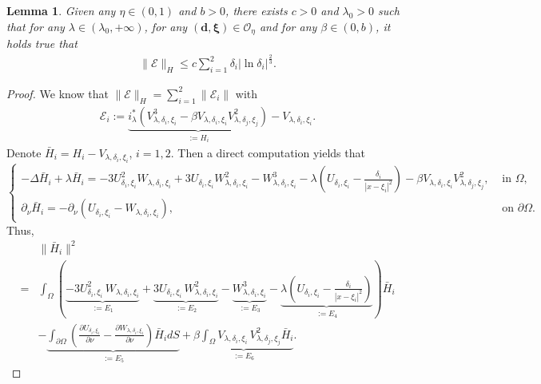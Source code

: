 \documentclass[a4paper,reqno,11pt,oneside]{amsart}
\numberwithin{equation}{section}
\newtheorem{Lem}[Thm]{Lemma}
\begin{document}
    \begin{Lem}\label{errore}Given any $\eta\in(0,1)$ and $b>0$, there exists $c>0$ and $\lambda_0>0$ such that for any $\lambda \in (\lambda_0,+\infty)$, for any $\left(\bm{d}, \bm{\xi}\right)\in \mathcal{O}_\eta$ and for any $\beta\in (0,b)$, it holds true that
    \begin{align}
    \label{error-size-1-vec} \|\bm{\mathcal{E}}\|_{H} \leq c \sum_{i=1}^2\delta_i|\ln{\delta_i}|^{\frac{2}{3}}.
\end{align}
\end{Lem}
\begin{proof}
We know that
$
\|\bm{\mathcal{E}}\|_H=\sum_{i=1}^2\|\mathcal{E}_i\|
$ with 
\begin{align*}
    \mathcal{E}_i:= \underbrace{i_\lambda^{*}\left(V_{\lambda,\delta_i,\xi_i}^3-\beta V_{\lambda,\delta_i,\xi_i}V_{\lambda,\delta_j,\xi_j}^2\right)}_{:=H_i}-V_{\lambda,\delta_i,\xi_i}.
\end{align*}
Denote $\bar H_i=H_i-V_{\lambda,\delta_i,\xi_i}$, $i=1,2$. Then a direct computation yields that
$$    
\begin{cases}
-\Delta \bar H_i\!+\!\lambda \bar H_i\!=-3 U_{ {\delta_i}, {\xi_i}}^2W_{\lambda,\delta_i,\xi_i}\!+\!3U_{ {\delta_i}, {\xi_i}}W_{\lambda,\delta_i,\xi_i}^2\!-\!W_{\lambda,\delta_i,\xi_i}^3\!-\!\lambda\!\left(\!U_{ {\delta_i}, {\xi_i}}-\frac{\delta_i}{|x-\xi_i|^{2}}\!\right)\!-\beta V_{\lambda,\delta_i,\xi_i}\!V_{\lambda,\delta_j,\xi_j}^2, &\text{ in $\Omega$},\\
\partial_{\nu} \bar H_i=-\partial_{\nu}\left( U_{ {\delta_i}, {\xi_i}}-W_{\lambda,\delta_i,\xi_i}\right),&\text{ on $\partial\Omega$.}\end{cases}
$$
Thus,
\begin{align*}
    &\|\bar H_i\|^2\\=&\displaystyle\int_{\Omega}\left({\underbrace{-3 U_{ {\delta_i}, {\xi_i}}^2\,W_{\lambda,\delta_i,\xi_i}}_{:=E_1}+\underbrace{3U_{ {\delta_i}, {\xi_i}}\,W_{\lambda,\delta_i,\xi_i}^2}_{:=E_2}-\underbrace{W_{\lambda,\delta_i,\xi_i}^3}_{:=E_3}-\underbrace{\lambda\left(U_{ {\delta_i}, {\xi_i}}-\frac{\delta_i}{|x-\xi_i|^{2}}\right)}_{:=E_4}}\right)\bar H_i\\&-\underbrace{\displaystyle{\int_{\partial\Omega}}\left(\frac{\partial U_{ {\delta_i}, {\xi_i}}}{\partial \nu}-\frac{\partial  W_{\lambda,\delta_i,\xi_i}}{\partial \nu}\right)\bar H_i dS}_{:=E_5}+\underbrace{\beta\displaystyle\int_{\Omega} V_{\lambda,\delta_i,\xi_i}\,V_{\lambda,\delta_j,\xi_j}^2\bar H_i}_{:=E_6}.
\end{align*}

\end{proof}
\end{document}
